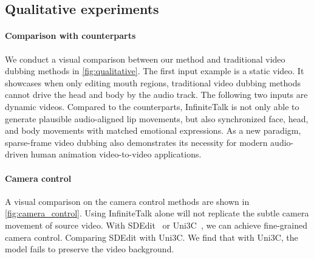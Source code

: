 \subsection{Qualitative experiments}
% 
\paragraph{Comparison with counterparts}
We conduct a visual comparison between our method and traditional video dubbing methods in \cref{fig:qualitative}. The first input example is a static video. It showcases when only editing mouth regions, traditional video dubbing methods cannot drive the head and body by the audio track. The following two inputs are dynamic videos. Compared to the counterparts, InfiniteTalk is not only able to generate plausible audio-aligned lip movements, but also synchronized face, head, and body movements with matched emotional expressions. As a new paradigm, sparse-frame video dubbing also demonstrates its necessity for modern audio-driven human animation video-to-video applications.


\paragraph{Camera control}
A visual comparison on the camera control methods are shown in \cref{fig:camera_control}. Using InfiniteTalk alone will not replicate the subtle camera movement of source video. With SDEdit~\cite{sdedit} or Uni3C~\cite{cao2025uni3c}, we can achieve fine-grained camera control. Comparing SDEdit with Uni3C. We find that with Uni3C, the model fails to preserve the video background. 

% 

